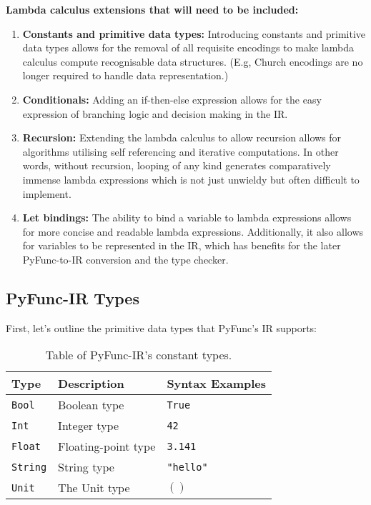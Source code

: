 \documentclass{l4proj}
\begin{document}
\textbf{Lambda calculus extensions that will need to be included:}
\begin{enumerate}
    \item \textbf{Constants and primitive data types:} Introducing constants and primitive data types allows for the removal of all requisite encodings to make lambda calculus compute recognisable data structures. (E.g, Church encodings are no longer required to handle data representation.)
    \item \textbf{Conditionals:} Adding an if-then-else expression allows for the easy expression of branching logic and decision making in the IR.
    \item \textbf{Recursion:} Extending the lambda calculus to allow recursion allows for algorithms utilising self referencing and iterative computations.
    In other words, without recursion, looping of any kind generates comparatively immense lambda expressions which is not just unwieldy but often difficult to implement.
    \item \textbf{Let bindings:} The ability to bind a variable to lambda expressions allows for more concise and readable lambda expressions.
    Additionally, it also allows for variables to be represented in the IR, which has benefits for the later PyFunc-to-IR conversion and the type checker. 
\end{enumerate}

\subsection{PyFunc-IR Types}

First, let's outline the primitive data types that PyFunc's IR supports:

\begin{table}[h]
\caption{Table of PyFunc-IR's constant types.}
\label{tab:pyfunc-ir-constants}
\begin{center}
\begin{tabular}{@{}|l|l|l|@{}}
    \hline
    \textbf{Type}        & \textbf{Description}      & \textbf{Syntax Examples}  \\
    \hline
    \texttt{Bool}        & Boolean type              & \texttt{True}       \\
    \texttt{Int}         & Integer type              & \texttt{42}         \\
    \texttt{Float}       & Floating-point type       & \texttt{3.141}      \\
    \texttt{String}      & String type               & \texttt{"hello"}    \\
    \texttt{Unit}        & The Unit type             & \texttt{$()$}       \\ 
    \hline
\end{tabular}
\end{center}
\end{table}
\end{document}
